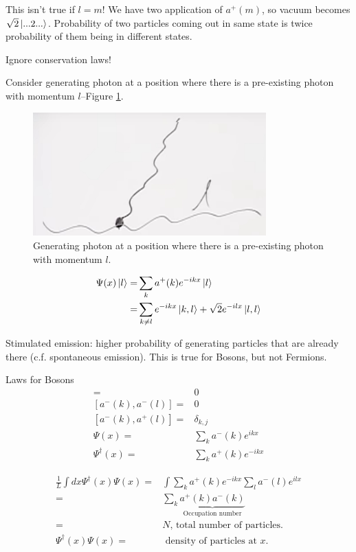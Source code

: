 \documentclass[]{article}
\begin{document}
This isn't true if $l=m$! We have two application of $a^+(m)$, so vacuum becomes $\sqrt{2}\ket{...2...}$. Probability of two particles coming out in same state is twice probability of them being in different states.

Ignore conservation laws!

Consider generating photon at a position where there is a pre-existing photon with momentum $l$--Figure \ref{fig:simple:decay}.
\begin{figure}[H]
	\caption{Generating photon at a position where there is a pre-existing photon with momentum $l$.}\label{fig:simple:decay}
	\includegraphics[width=0.8\textwidth]{decay}
\end{figure}

\begin{align*}
\Psi(x)\ket{l} =& \sum_k a^+(k) e^{-ikx} \ket{l}\\
=& \sum_{k\ne l} e^{-ikx} \ket{k,l} + \sqrt{2} e^{-ilx} \ket{l,l}
\end{align*}

Stimulated emission: higher probability of generating particles that are already there (c.f. spontaneous emission). This is true for Bosons, but not Fermions.
 
 Laws for Bosons
 \begin{align*}
 [a^+(k),a^+(l)] =& 0\\
 [a^-(k),a^-(l)] =& 0\\
 [a^-(k),a^+(l)] =& \delta_{k,j}\\
 \Psi(x) =& \sum_k a^-(k) e^{ikx} \\
 \Psi^\dagger(x) =& \sum_k a^+(k) e^{-ikx}
 \end{align*}
 
 \begin{align*}
 \frac{1}{L}\int dx \Psi^\dagger(x) \Psi(x) =& \int  \sum_k a^+(k) e^{-ikx} \sum_l a^-(l) e^{ilx}\\
 =&  \sum_k \underbrace{a^+(k) a^-(k)}_\text{Occupation number}\\
 =& N \text{, total number of particles.}\\
 \Psi^\dagger(x) \Psi(x) =& \text{ density of particles at $x$}.
 \end{align*}
\end{document}
